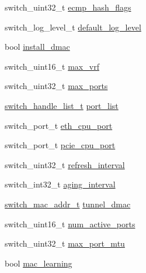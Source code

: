 \begin{DoxyCompactItemize}
\item 
switch\+\_\+uint32\+\_\+t \hyperlink{structswitch__api__device__info__s_a7ce9f935b5bfdb8f891e835db8ed7e05}{ecmp\+\_\+hash\+\_\+flags}
\item 
switch\+\_\+log\+\_\+level\+\_\+t \hyperlink{structswitch__api__device__info__s_a46b4681cedb2ff5c0843a371640daf38}{default\+\_\+log\+\_\+level}
\item 
bool \hyperlink{structswitch__api__device__info__s_a2291c5b9b3cb1450852478bf90df5a6e}{install\+\_\+dmac}
\item 
switch\+\_\+uint16\+\_\+t \hyperlink{structswitch__api__device__info__s_aa8590487144b0fe01959b7b717f68022}{max\+\_\+vrf}
\item 
switch\+\_\+uint32\+\_\+t \hyperlink{structswitch__api__device__info__s_aa51241cbf2c66c030e6dbdd3734512a1}{max\+\_\+ports}
\item 
\hyperlink{structswitch__handle__list__s}{switch\+\_\+handle\+\_\+list\+\_\+t} \hyperlink{structswitch__api__device__info__s_a07aea87d15a339a7c24f743cd9253bcb}{port\+\_\+list}
\item 
switch\+\_\+port\+\_\+t \hyperlink{structswitch__api__device__info__s_a304caaf49e036b1981e37a6aa53fa377}{eth\+\_\+cpu\+\_\+port}
\item 
switch\+\_\+port\+\_\+t \hyperlink{structswitch__api__device__info__s_a16ae76a1071523609b503735c3bea431}{pcie\+\_\+cpu\+\_\+port}
\item 
switch\+\_\+uint32\+\_\+t \hyperlink{structswitch__api__device__info__s_a254206c03e9010d7a479e17d96bd0e6d}{refresh\+\_\+interval}
\item 
switch\+\_\+int32\+\_\+t \hyperlink{structswitch__api__device__info__s_ad763fad91b193319f4b033f5250ab245}{aging\+\_\+interval}
\item 
\hyperlink{structswitch__mac__addr__s}{switch\+\_\+mac\+\_\+addr\+\_\+t} \hyperlink{structswitch__api__device__info__s_a7dde512ce1357c13af47c052b3bae6ad}{tunnel\+\_\+dmac}
\item 
switch\+\_\+uint16\+\_\+t \hyperlink{structswitch__api__device__info__s_a7e1c4e293a457ef2c6edc1a83a13c52a}{num\+\_\+active\+\_\+ports}
\item 
switch\+\_\+uint32\+\_\+t \hyperlink{structswitch__api__device__info__s_a514fef0113d6c42d6cdef95e475fb395}{max\+\_\+port\+\_\+mtu}
\item 
bool \hyperlink{structswitch__api__device__info__s_a955f4d46b6e96bf792f9459ea56568bc}{mac\+\_\+learning}
\end{DoxyCompactItemize}



